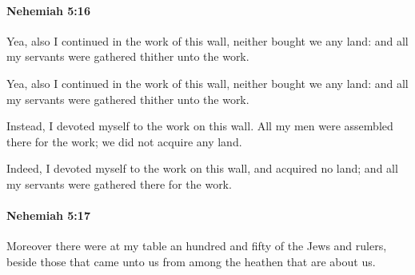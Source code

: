 		\paragraph{Nehemiah 5:16} %
			\label{NEHEMIAH-5-16}

			Yea, also I continued in the work of this wall, neither bought we any land: and all my servants were gathered thither unto the work.

			\begin{versebox}
					\item[BHS] 
					\item[LXX] 
					\item[ASV] Yea, also I continued in the work of this wall, neither bought we any land: and all my servants were gathered thither unto the work.
					\item[NIV] Instead, I devoted myself to the work on this wall. All my men were assembled there for the work; we did not acquire any land.
					\item[NRSV] Indeed, I devoted myself to the work on this wall, and acquired no land; and all my servants were gathered there for the work.
			\end{versebox}

		\paragraph{Nehemiah 5:17} %
			\label{NEHEMIAH-5-17}

			Moreover there were at my table an hundred and fifty of the Jews and rulers, beside those that came unto us from among the heathen that are about us.

